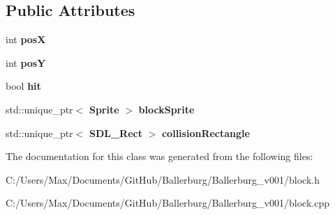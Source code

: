 \subsection*{Public Attributes}
\begin{DoxyCompactItemize}
\item 
int {\bfseries pos\+X}\label{class_block_ad1db677097e72dd66e59a29f0bbce569}

\item 
int {\bfseries pos\+Y}\label{class_block_a675610bc12401b8d5f494ddae9998916}

\item 
bool {\bfseries hit}\label{class_block_a76234c3996d52d7ddc841c48284feecf}

\item 
std\+::unique\+\_\+ptr$<$ {\bf Sprite} $>$ {\bfseries block\+Sprite}\label{class_block_ac9e117395424b43eced9cee542bbe68b}

\item 
std\+::unique\+\_\+ptr$<$ {\bf S\+D\+L\+\_\+\+Rect} $>$ {\bfseries collision\+Rectangle}\label{class_block_a7720f1fde214267bd9003e2480c96be5}

\end{DoxyCompactItemize}


The documentation for this class was generated from the following files\+:\begin{DoxyCompactItemize}
\item 
C\+:/\+Users/\+Max/\+Documents/\+Git\+Hub/\+Ballerburg/\+Ballerburg\+\_\+v001/block.\+h\item 
C\+:/\+Users/\+Max/\+Documents/\+Git\+Hub/\+Ballerburg/\+Ballerburg\+\_\+v001/block.\+cpp\end{DoxyCompactItemize}
